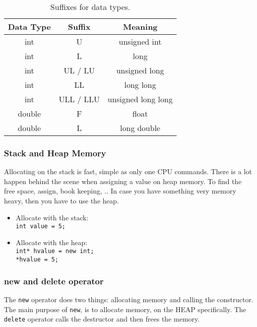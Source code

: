 \begin{table}[htb!]
	\centering
	\begin{tabular}{ccc}
		\textbf{Data Type} & \textbf{Suffix}   & \textbf{Meaning}   \\
		\hline\hline
		int                & U               & unsigned int       \\
		int                & L               & long               \\
		int                & UL / LU         & unsigned long      \\
		int                & LL              & long long          \\
		int                & ULL / LLU       & unsigned long long \\
		double             & F               & float               \\
		double             & L               & long double       
	\end{tabular}
	\caption{Suffixes for data types.}
\end{table}

\subsubsection{Stack and Heap Memory}

Allocating on the stack is fast, simple as only one CPU commands. There is a lot happen behind the scene when assigning a value on heap memory. To find the free space, assign, book keeping, .. In case you have something very memory heavy, then you have to use the heap.

\begin{itemize}
	\setlength\itemsep{0em}
	\item Allocate with the stack:\\
	\verb|int value = 5;|	
	\item Allocate with the heap:\\
	\verb|int* hvalue = new int;|\\
	\verb|*hvalue = 5;|
\end{itemize}

\subsubsection{new and delete operator}

The \verb|new| operator does two things: allocating memory and calling the constructor. The main purpose of \verb|new|, is to allocate memory, on the HEAP specifically. The \verb|delete| operator calls the destructor and then frees the memory.


